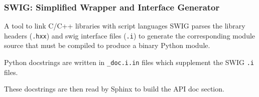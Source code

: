 \documentclass[8pt, handout]{beamer}
\begin{document}
\begin{frame}
\frametitle{SWIG: Simplified Wrapper and Interface Generator}
\begin{block}{A tool to link C/C++ libraries with script languages}
    SWIG parses the library headers (\texttt{.hxx}) and swig interface files (\texttt{.i}) to
    generate the corresponding module source that must be compiled to
    produce a binary Python module.
\end{block}
\centering {} \medskip

Python \alert{docstrings} are written in \texttt{\_doc.i.in} files which supplement the \alert{SWIG} \texttt{.i} files.

These docstrings are then read by \alert{Sphinx} to build the API doc section.
\end{frame}
\end{document}
